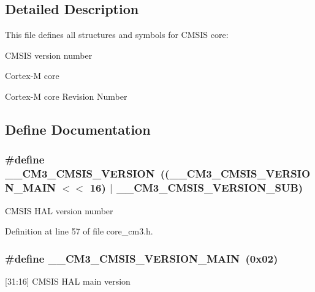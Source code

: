 \subsection{\-Detailed \-Description}
\-This file defines all structures and symbols for \-C\-M\-S\-I\-S core\-:
\begin{DoxyItemize}
\item \-C\-M\-S\-I\-S version number
\item \-Cortex-\/\-M core
\item \-Cortex-\/\-M core \-Revision \-Number 
\end{DoxyItemize}

\subsection{\-Define \-Documentation}
\hypertarget{group___c_m_s_i_s__core__definitions_gaf888c651cd8c93fd25364f9e74306a1c}{
\subsubsection[{\-\_\-\-\_\-\-C\-M3\-\_\-\-C\-M\-S\-I\-S\-\_\-\-V\-E\-R\-S\-I\-O\-N}]{\setlength{\rightskip}{0pt plus 5cm}\#define {\bf \-\_\-\-\_\-\-C\-M3\-\_\-\-C\-M\-S\-I\-S\-\_\-\-V\-E\-R\-S\-I\-O\-N}~(({\bf \-\_\-\-\_\-\-C\-M3\-\_\-\-C\-M\-S\-I\-S\-\_\-\-V\-E\-R\-S\-I\-O\-N\-\_\-\-M\-A\-I\-N} $<$$<$ 16) $|$ {\bf \-\_\-\-\_\-\-C\-M3\-\_\-\-C\-M\-S\-I\-S\-\_\-\-V\-E\-R\-S\-I\-O\-N\-\_\-\-S\-U\-B})}}\label{group___c_m_s_i_s__core__definitions_gaf888c651cd8c93fd25364f9e74306a1c}
\-C\-M\-S\-I\-S \-H\-A\-L version number 

\-Definition at line 57 of file core\-\_\-cm3.\-h.

\hypertarget{group___c_m_s_i_s__core__definitions_gac1c1120e9fe082fac8225c60143ac79a}{
\subsubsection[{\-\_\-\-\_\-\-C\-M3\-\_\-\-C\-M\-S\-I\-S\-\_\-\-V\-E\-R\-S\-I\-O\-N\-\_\-\-M\-A\-I\-N}]{\setlength{\rightskip}{0pt plus 5cm}\#define {\bf \-\_\-\-\_\-\-C\-M3\-\_\-\-C\-M\-S\-I\-S\-\_\-\-V\-E\-R\-S\-I\-O\-N\-\_\-\-M\-A\-I\-N}~(0x02)}}\label{group___c_m_s_i_s__core__definitions_gac1c1120e9fe082fac8225c60143ac79a}
\mbox{[}31\-:16\mbox{]} \-C\-M\-S\-I\-S \-H\-A\-L main version 

